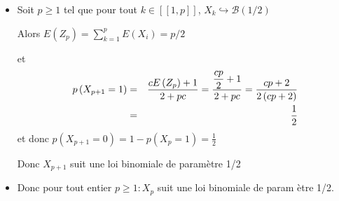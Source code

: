 \documentclass[a4paper, 11pt,reqno]{article}
\begin{document}
\begin{correction}
\begin{enumerate}
\begin{enumerate}
\begin{itemize}
\item Soit $p\ge 1$ tel que pour tout $k\in \left[ \left[ 1,p\right] \right] 
$, $X_{k}\hookrightarrow \mathcal{B}\left( 1/2\right) $

Alors $E\left( Z_{p}\right) =\sum_{k=1}^{p}E\left( X_{i}\right) =p/2$

et 
\begin{eqnarray*}
p\left( X_{p+1}=1\right) &=&\frac{cE\left( Z_{p}\right) +1}{2+pc}=\frac{%
\displaystyle \frac{cp}{2}+1}{2+pc}=\frac{cp+2}{2\left( cp+2\right) } \\
&=&\frac{1}{2}
\end{eqnarray*}
et donc $p\left( X_{p+1}=0\right) =1-p\left( X_{p}=1\right) =\frac{1}{2}$

Donc $X_{p+1}$ suit une loi binomiale de param\`{e}tre 1/2

\item Donc pour tout entier $p\geq 1:X_{p}$ suit une loi binomiale de param%
\`{e}tre 1/2.
\end{itemize}
\end{enumerate}
\end{enumerate}
\end{correction}
\end{document}
